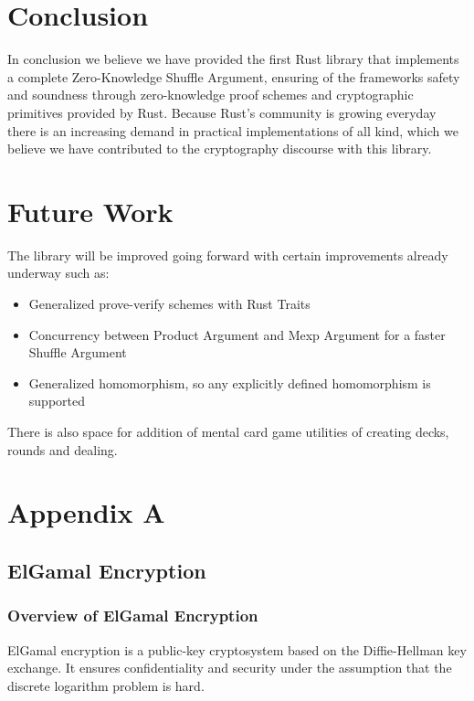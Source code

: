 \documentclass[12pt,a4paper]{report}
\begin{document}
\chapter{Conclusion}
In conclusion we believe we have provided the first Rust library that implements a complete Zero-Knowledge Shuffle Argument, ensuring of the frameworks safety and soundness through zero-knowledge proof schemes and cryptographic primitives provided by Rust.
Because Rust's community is growing everyday there is an increasing demand in practical implementations of all kind, which we believe we have contributed to the cryptography discourse with this library.

\chapter{Future Work}
The library will be improved going forward with certain improvements already underway such as:
\begin{itemize}
	\item Generalized prove-verify schemes with Rust Traits
	\item Concurrency between Product Argument and Mexp Argument for a faster Shuffle Argument
	\item Generalized homomorphism, so any explicitly defined homomorphism is supported
\end{itemize}
There is also space for addition of mental card game utilities of creating decks, rounds and dealing.

\newpage
{}



\appendix
\chapter{Appendix A}
\section{ElGamal Encryption}

\subsection{Overview of ElGamal Encryption}
ElGamal encryption is a public-key cryptosystem based on the Diffie-Hellman key exchange. It ensures confidentiality and security under the assumption that the discrete logarithm problem is hard.
\end{document}
